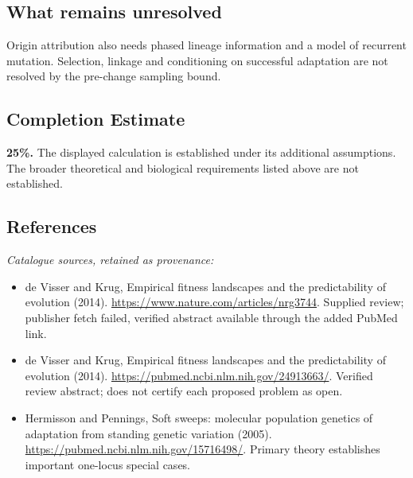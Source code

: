 \documentclass[11pt]{article}
\begin{document}
\subsection{What remains unresolved}
Origin attribution also needs phased lineage information and a model of recurrent mutation. Selection, linkage and conditioning on successful adaptation are not resolved by the pre-change sampling bound.
\subsection{Completion Estimate}
\textbf{25\%.} The displayed calculation is established under its additional assumptions. The broader theoretical and biological requirements listed above are not established.
\subsection{References}
\noindent\emph{Catalogue sources, retained as provenance:}
\begin{itemize}
\item de Visser and Krug, Empirical fitness landscapes and the predictability of evolution (2014). \url{https://www.nature.com/articles/nrg3744}. Supplied review; publisher fetch failed, verified abstract available through the added PubMed link.
\item de Visser and Krug, Empirical fitness landscapes and the predictability of evolution (2014). \url{https://pubmed.ncbi.nlm.nih.gov/24913663/}. Verified review abstract; does not certify each proposed problem as open.
\item Hermisson and Pennings, Soft sweeps: molecular population genetics of adaptation from standing genetic variation (2005). \url{https://pubmed.ncbi.nlm.nih.gov/15716498/}. Primary theory establishes important one-locus special cases.
\end{itemize}
\clearpage


\appendix
\end{document}
